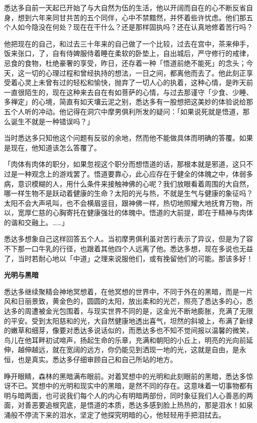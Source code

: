 \documentclass[twoside,openany]{book}
\newcommand{\mt}[1]{\textbullet \textbf{#1}}
\begin{document}
悉达多自前一天起已开始了与大自然为伍的生活，他以开阔而自在的心不断反省自身，想到六年来同甘共苦的五个同伴，心中不禁黯然，并怀着些许忧虑。他们那五个人如今隐没在何处？现在在干什么？还是那样固执吗？还在认真地修着苦行吗？

他把现在的自己，和过去三十年来的自己做了一个比较，过去在宫中，茶来伸手，饭来张口，了，自有侍婢服侍着睡在柔软的卧垫上，自出城后，严守修行的戒律，忌食的食物，杜绝豪奢的享受，昨日，还存着一种「悟道前绝不能死」的念头；今天，这一切的心理过程和曾经执持的想法，一日之间，都离他而去了。他此刻正享受着心灵上未曾有过的轻松和愉快，抛弃了一切人心的执着，这种心情，是昨天前一直很陌生的，现在这种来去自在有如菩萨的心情，与过去那谨守「少食、少睡、多禅定」的心境，简直有如天壤云泥之别，悉达多有一股想把这美妙的体验说给那五个人听的冲动。他记得在洞穴中摩男俱利所发的疑问：「如果说死就是悟道，那么诞生不就是一种错误吗？」

当时悉达多只知他这个问题有反驳的余地，然而他不能做具体而明确的答覆。如果是现在，他知道该怎么答覆了。

「肉体有肉体的职分，如果忽视这个职分而想悟道的话，那根本就是邪道，这只不过是一种观念上的游戏罢了。悟道要靠心，此心应存在于健全的体魄之中，体弱多病，意识模糊的人，用什么条件来接触神佛的心呢？我们放眼看着周围的大自然，哪一样生物不是跃动着健康的生命？太阳的光与热，不就是生气与健康的象征吗？太阳不会大声吼叫，也不会横眉竖目，跟神佛一样，热切地照耀大地抚育万物，所以，宽厚仁慈的心胸寄托在健康强壮的体魄中。悟道的大前提，即在于精神与肉体的谐和交融上。……」

悉达多想象自己这样回答五个人。当初摩男俱利虽对苦行表示了异议，但是为了容不下那一口牛乳的行径，也跟着其他四个人远离了他。悉达多想，现在多说也无益了，当时若耐心地以「中道」之理来说服他们，或有挽留他们的可能。那该多好！

\mt{光明与黑暗}

悉达多继续聚精会神地冥想着，在他冥想的世界中，不同于外在的黑暗，而是一片风和日丽景致，黄金色的，圆圆的太阳，放出柔和的光芒，照亮了悉达多的心，悉达多的周遭被金光包围着，与现实世界不同的是，这金光不断地膨胀，充满了无限的平安。受到太阳慈和的光，大自然健康地透出喜气，坦然的斜坡上，布满了新绿的嫩草和细芽，像要对悉达多说话似的，而悉达多也不知不觉间报以温馨的微笑，鸟儿在他耳畔初试啼声，扬起生命的乐章，充满和朝阳的小丘上，明亮的光向前延伸，越伸越远，就在宽阔的远方，你仍能见到洒现一地的光，这就是自由，是永恒，也是真实。悉达多仔细审顾自己和自己所站的地方。

睁开眼睛，森林的黑暗满布眼前。对着冥想中的光明和此刻眼前的黑暗，悉达多惊讶不已。冥想中的光明和现实中的黑暗，是然不同的存在。这意味着一切事物都有明与暗两面，也可说我们每个人的内心有明暗两部份，同时象征我们人心善恶的两面，对善恶要追根究底，是悟道的本质，悉达多感到脸上热热的，那是泪水！如泉涌般不停流下来的泪水，坚定了他探究明暗的心，他轻轻用手把泪拭去。
\end{document}
